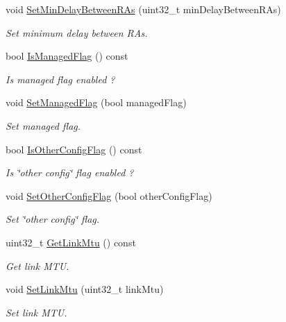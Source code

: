 \begin{DoxyCompactItemize}
void \hyperlink{classns3_1_1RadvdInterface_a07df79df4f8bf4e33638279af9c56ff9}{Set\+Min\+Delay\+Between\+R\+As} (uint32\+\_\+t min\+Delay\+Between\+R\+As)
\begin{DoxyCompactList}\small\item\em Set minimum delay between R\+As. \end{DoxyCompactList}\item 
bool \hyperlink{classns3_1_1RadvdInterface_adffae8e8645cd5c47bed7b14bfb632ab}{Is\+Managed\+Flag} () const 
\begin{DoxyCompactList}\small\item\em Is managed flag enabled ? \end{DoxyCompactList}\item 
void \hyperlink{classns3_1_1RadvdInterface_aed241face132089860a95e969f255f15}{Set\+Managed\+Flag} (bool managed\+Flag)
\begin{DoxyCompactList}\small\item\em Set managed flag. \end{DoxyCompactList}\item 
bool \hyperlink{classns3_1_1RadvdInterface_ab2376536574748af977cfd8dd5c7d5d2}{Is\+Other\+Config\+Flag} () const 
\begin{DoxyCompactList}\small\item\em Is \char`\"{}other config\char`\"{} flag enabled ? \end{DoxyCompactList}\item 
void \hyperlink{classns3_1_1RadvdInterface_abd9a2ddbc4ec28dfa5d0cb22c284b30d}{Set\+Other\+Config\+Flag} (bool other\+Config\+Flag)
\begin{DoxyCompactList}\small\item\em Set \char`\"{}other config\char`\"{} flag. \end{DoxyCompactList}\item 
uint32\+\_\+t \hyperlink{classns3_1_1RadvdInterface_a02379026d62434cc5d87cd6f7c770d40}{Get\+Link\+Mtu} () const 
\begin{DoxyCompactList}\small\item\em Get link M\+TU. \end{DoxyCompactList}\item 
void \hyperlink{classns3_1_1RadvdInterface_a48f4c2a8976f3cc05acfd22d9ad328ca}{Set\+Link\+Mtu} (uint32\+\_\+t link\+Mtu)
\begin{DoxyCompactList}\small\item\em Set link M\+TU. \end{DoxyCompactList}\item 

\end{DoxyCompactItemize}
